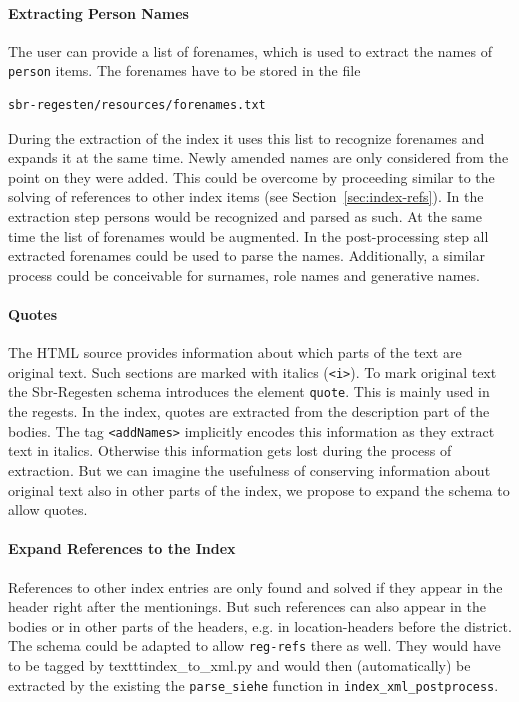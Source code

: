 \paragraph{Extracting Person Names}
The user can provide a list of forenames, which is used to extract the
names of \texttt{person} items. The forenames have to be stored in the
file

\begin{verbatim}
sbr-regesten/resources/forenames.txt
\end{verbatim}

During the extraction of the index it uses this list to recognize
forenames and expands it at the same time. Newly amended names are
only considered from the point on they were added. This could be
overcome by proceeding similar to the solving of references to other
index items (see Section~\ref{sec:index-refs}). In the extraction step
persons would be recognized and parsed as such. At the same time the
list of forenames would be augmented. In the post-processing step all
extracted forenames could be used to parse the names. Additionally, a
similar process could be conceivable for surnames, role names and
generative names.

\paragraph{Quotes}
The HTML source provides information about which parts of the text are
original text. Such sections are marked with italics (\texttt{<i>}).
To mark original text the Sbr-Regesten schema introduces the element
\texttt{quote}. This is mainly used in the regests. In the index,
quotes are extracted from the description part of the bodies. The tag
\texttt{<addNames>} implicitly encodes this information as they
extract text in italics. Otherwise this information gets lost during
the process of extraction. But we can imagine the usefulness of
conserving information about original text also in other parts of the
index, we propose to expand the schema to allow quotes.

\paragraph{Expand References to the Index}
References to other index entries are only found and solved if they
appear in the header right after the mentionings. But such references
can also appear in the bodies or in other parts of the headers, e.g.
in location-headers before the district. The schema could be adapted
to allow \texttt{reg-refs} there as well. They would have to be tagged
by texttt{index\_to\_xml.py} and would then (automatically) be
extracted by the existing the \texttt{parse\_siehe} function in
\texttt{index\_xml\_postprocess}.

